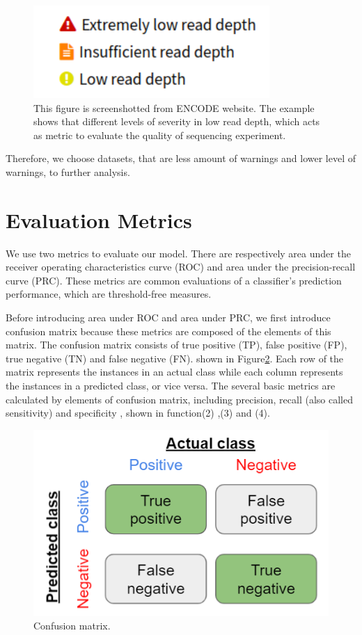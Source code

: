 \begin{figure}[H]
    \centering
    \includegraphics[width=0.5\columnwidth]{body/figure/figure13.png}
    \captionsetup{labelfont=bf}
    \renewcommand{\baselinestretch}{1.0}
    \caption[Example of warning levels]{This figure is screenshotted from ENCODE website. The example shows that different levels of severity in low read depth, which acts as metric to evaluate the quality of sequencing experiment.}
    \label{f13}
\end{figure}

Therefore, we choose datasets, that are less amount of warnings and lower level of warnings, to further analysis.

\section{Evaluation Metrics} \label{metric}
We use two metrics to evaluate our model. There are respectively area under the receiver operating characteristics curve (ROC) and area under the precision-recall curve (PRC). These metrics are common evaluations of a classifier’s prediction performance, which are threshold-free measures.

Before introducing area under ROC and area under PRC, we first introduce confusion matrix because these metrics are composed of the elements of this matrix. The confusion matrix consists of true positive (TP), false positive (FP), true negative (TN) and false negative (FN). shown in Figure\ref{f14}. Each row of the matrix represents the instances in an actual class while each column represents the instances in a predicted class, or vice versa. The several basic metrics are calculated by elements of confusion matrix, including precision, recall (also called sensitivity) and specificity \cite{saito2015precision}, shown in function(2) ,(3) and (4).

\begin{figure}[H]
    \centering
    \includegraphics[width=0.65\columnwidth]{body/figure/figure14.png}
    \captionsetup{labelfont=bf}
    \caption[Confusion matrix]{Confusion matrix.}
    \label{f14}
\end{figure}

